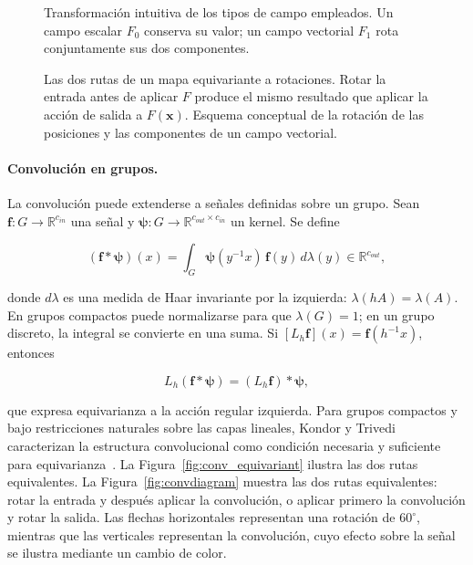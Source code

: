 \begin{figure}[htbp]
    \centering
    \resizebox{0.96\textwidth}{!}{}
    \caption{Transformación intuitiva de los tipos de campo empleados. Un
    campo escalar \(F_0\) conserva su valor; un campo vectorial
    \(F_1\) rota conjuntamente sus dos componentes.}
    \label{fig:tipos-campo-f01}
\end{figure}

\begin{figure}[htbp]
    \centering
    
    \caption[Las dos rutas de un mapa equivariante a rotaciones.]{Las dos
    rutas de un mapa equivariante a rotaciones. Rotar la entrada antes de
    aplicar \(F\) produce el mismo resultado que aplicar la acción de salida
    a \(F(\mathbf x)\). Esquema conceptual de la rotación de las posiciones
    y las componentes de un campo vectorial.}
    \label{fig:equivarianza-rotacional}
\end{figure}
\FloatBarrier
\paragraph{Convolución en grupos.}

La convolución puede extenderse a señales definidas sobre un grupo. Sean
\(\mathbf f:G\rightarrow\mathbb R^{c_{in}}\) una señal y
\(\boldsymbol\psi:G\rightarrow
\mathbb R^{c_{out}\times c_{in}}\) un kernel. Se define

\begin{equation}
    (\mathbf f*\boldsymbol\psi)(x)
    =\int_G \boldsymbol\psi(y^{-1}x)\,\mathbf f(y)\,d\lambda(y)
    \in\mathbb R^{c_{out}},
    \label{eq:convolucion-grupo}
\end{equation}

donde \(d\lambda\) es una medida de Haar invariante por la izquierda:
\(\lambda(hA)=\lambda(A)\). En grupos compactos puede normalizarse para que
\(\lambda(G)=1\); en un grupo discreto, la integral se convierte en una suma.
Si \([L_h\mathbf f](x)=\mathbf f(h^{-1}x)\), entonces

\begin{equation}
    L_h(\mathbf f*\boldsymbol\psi)
      =(L_h\mathbf f)*\boldsymbol\psi,
    \label{eq:equivarianza-convolucion-grupo}
\end{equation}

que expresa equivarianza a la acción regular izquierda. Para grupos compactos
y bajo restricciones naturales sobre las capas lineales, Kondor y Trivedi
caracterizan la estructura convolucional como condición necesaria y suficiente
para equivarianza~\cite{kondor_generalization_2018}. La
Figura~\ref{fig:conv_equivariant} ilustra las dos rutas equivalentes.
La Figura~\ref{fig:convdiagram} muestra las dos rutas equivalentes: rotar la
entrada y después aplicar la convolución, o aplicar primero la convolución y
rotar la salida. Las flechas horizontales representan una rotación de
\(60^\circ\), mientras que las verticales representan la convolución, cuyo
efecto sobre la señal se ilustra mediante un cambio de color.

